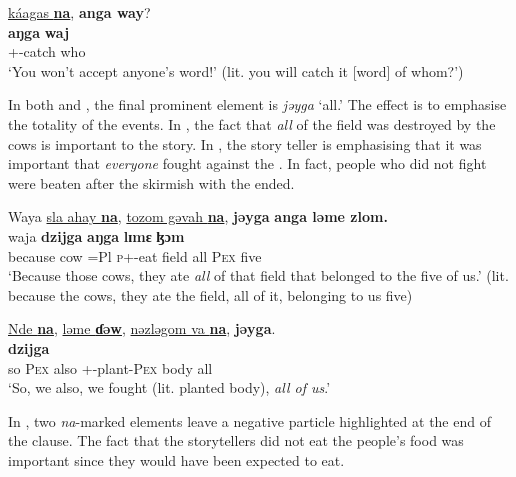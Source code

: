 \medskip
\underline{k\'{a}agas  \textbf{na}},  \textbf{anga  way}?\\ 
\gll {}  \textbf{aŋga}      \textbf{waj}\\
     {\twoS}+{\POT}-catch  {\PSP} {\POSS}    who\\
\glt ‘You won't accept anyone's word!' (lit. you will catch it [word] of whom?’) \\ 
\z

In both  and , the final prominent element is \textit{jəyga}  ‘all.’ The effect is to emphasise the totality of the events. In , the fact that \textit{all} of the field was destroyed by the cows is important to the story. In , the story teller is emphasising that it was important that \textit{everyone} fought against the . In fact, people who did not fight were beaten after the skirmish with the  ended.

\ea \label{ex:11:48}
Waya  \underline{sla  ahay  \textbf{na}},  \underline{tozom  gəvah  \textbf{na}}, \textbf{jəyga}   \textbf{anga  ləme  zlom.}\\
\gll  waja             \textbf{{dzijga}}  \textbf{aŋga}    \textbf{lɪmɛ}      \textbf{ɮɔm}\\
      because  cow    =Pl  {\PSP}  \textsc{p}+{\PFV}-eat   field   {\PSP}      all      {\POSS}    \textsc{Pex}   five \\
\glt  ‘Because those cows, they ate \textit{all} of that field that belonged to the five of us.’ (lit. because the cows, they ate the field, all of it, belonging to us five)
\z

\ea \label{ex:11:49}
\underline{Nde  \textbf{na}},  \underline{ləme  \textbf{ɗəw}},  \underline{nəzləgom  va  \textbf{na}},  \textbf{jəyga}.\\
\gll  {}                      \textbf{dzijga}\\
     so   {\PSP}  \textsc{Pex}  also  +{\PFV}-plant-\textsc{Pex}  body  {\PSP}  all\\
\glt  ‘So, we also, we fought (lit. planted body), \textit{all of us}.’
\z

In , two \textit{na}{}-marked elements leave a negative particle highlighted at the end of the clause. The fact that the storytellers did not eat the people’s food was important since they would have been expected to eat.
\newpage 

